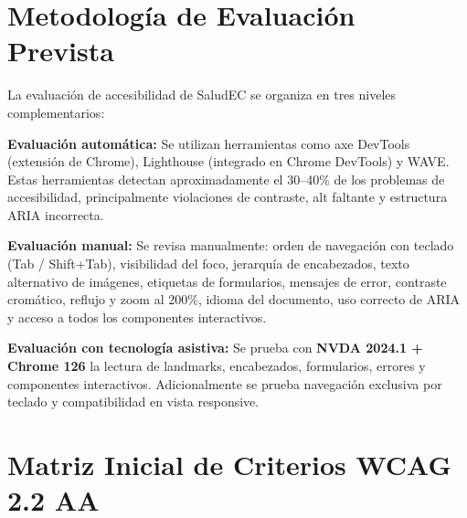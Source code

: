 \documentclass[12pt, a4paper]{article}
\begin{document}
\section{Metodología de Evaluación Prevista}

La evaluación de accesibilidad de SaludEC se organiza en tres niveles complementarios:

\textbf{Evaluación automática:}
Se utilizan herramientas como axe DevTools (extensión de Chrome), Lighthouse (integrado en Chrome DevTools) y WAVE. Estas herramientas detectan aproximadamente el 30--40\% de los problemas de accesibilidad, principalmente violaciones de contraste, alt faltante y estructura ARIA incorrecta.

\textbf{Evaluación manual:}
Se revisa manualmente: orden de navegación con teclado (Tab / Shift+Tab), visibilidad del foco, jerarquía de encabezados, texto alternativo de imágenes, etiquetas de formularios, mensajes de error, contraste cromático, reflujo y zoom al 200\%, idioma del documento, uso correcto de ARIA y acceso a todos los componentes interactivos.

\textbf{Evaluación con tecnología asistiva:}
Se prueba con \textbf{NVDA 2024.1 + Chrome 126} la lectura de landmarks, encabezados, formularios, errores y componentes interactivos. Adicionalmente se prueba navegación exclusiva por teclado y compatibilidad en vista responsive.

\section{Matriz Inicial de Criterios WCAG 2.2 AA}
\end{document}
